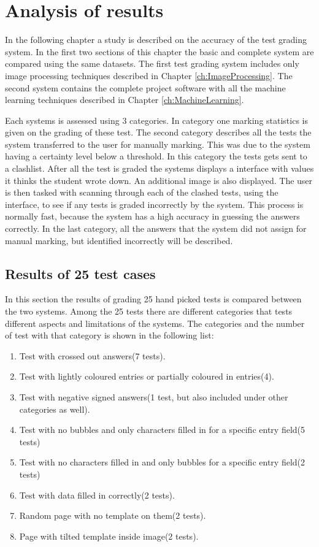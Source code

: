 \chapter{Analysis of results}
\label{ch:Results}
\ifpdf
\graphicspath{{Chapter5/Chapter5Figures/}}
\fi

In the following chapter a study is described on the accuracy of the test grading system. In the first two sections of this chapter the basic and complete system are compared using the same datasets. The first test grading system includes only image processing techniques described in Chapter \ref{ch:ImageProcessing}. The second system contains the complete project software with all the machine learning techniques described in Chapter \ref{ch:MachineLearning}.

Each systems is assessed using 3 categories. In category one marking statistics is given on the grading of these test. The second category describes all the tests the system transferred to the user for manually marking. This was due to the system having a certainty level below a threshold. In this category the tests gets sent to a clashlist. After all the test is graded the systems displays a interface with values it thinks the student wrote down. An additional image is also displayed. The user is then tasked with scanning through each of the clashed tests, using the interface, to see if any tests is graded incorrectly by the system. This process is normally fast, because the system has a high accuracy in guessing the answers correctly. In the last category, all the answers that the system did not assign for manual marking, but identified incorrectly will be described.

\section{Results of 25 test cases}

In this section the results of grading 25 hand picked tests is compared between the two systems. Among the 25 tests there are different categories that tests different aspects and limitations of the systems. The categories and the number of test with that category is shown in the following list:

\begin{enumerate}
\item Test with crossed out answers(7 tests).
\item Test with lightly coloured entries or partially coloured in entries(4).
\item Test with negative signed answers(1 test, but also included under other categories as well).
\item Test with no bubbles and only characters filled in for a specific entry field(5 tests)
\item Test with no characters filled in and only bubbles for a specific entry field(2 tests)
\item Test with data filled in correctly(2 tests).
\item Random page with no template on them(2 tests).
\item Page with tilted template inside image(2 tests).
\end{enumerate}

